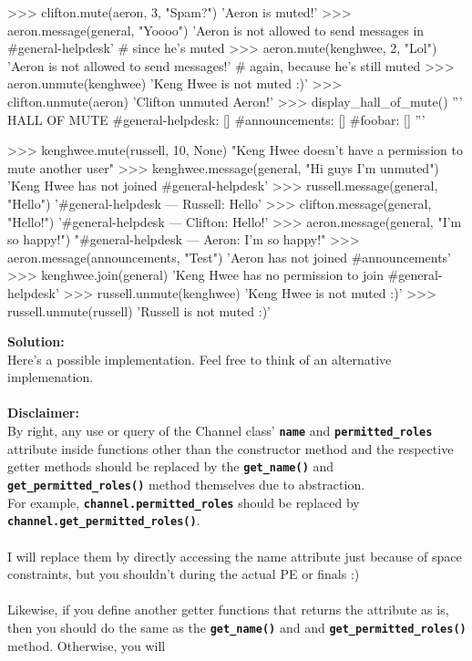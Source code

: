\begin{python}
>>> clifton.mute(aeron, 3, "Spam?")
'Aeron is muted!'
>>> aeron.message(general, "Yoooo")
'Aeron is not allowed to send messages in #general-helpdesk'
# since he's muted
>>> aeron.mute(kenghwee, 2, "Lol")
'Aeron is not allowed to send messages!'
# again, because he's still muted
>>> aeron.unmute(kenghwee)
'Keng Hwee is not muted :)'
>>> clifton.unmute(aeron)
'Clifton unmuted Aeron!'
>>> display_hall_of_mute()
'''
HALL OF MUTE
#general-helpdesk: []
#announcements: []
#foobar: []
'''

>>> kenghwee.mute(russell, 10, None)
"Keng Hwee doesn't have a permission to mute another user"
>>> kenghwee.message(general, "Hi guys I'm unmuted")
'Keng Hwee has not joined #general-helpdesk'
>>> russell.message(general, "Hello")
'#general-helpdesk --- Russell: Hello'
>>> clifton.message(general, "Hello!")
'#general-helpdesk --- Clifton: Hello!'
>>> aeron.message(general, "I'm so happy!")
"#general-helpdesk --- Aeron: I'm so happy!"
>>> aeron.message(announcements, "Test")
'Aeron has not joined #announcements'
>>> kenghwee.join(general)
'Keng Hwee has no permission to join #general-helpdesk'
>>> russell.unmute(kenghwee)
'Keng Hwee is not muted :)'
>>> russell.unmute(russell)
'Russell is not muted :)'
\end{python}
\textbf{Solution:} \\
Here's a possible implementation. Feel free to think of an alternative implemenation. \\ \\
\textbf{Disclaimer:} \\
By right, any use or query of the Channel class' \texttt{\bfseries name} and \texttt{\bfseries permitted\_roles} attribute 
inside functions other than the constructor method and the respective getter methods should be replaced by 
the \texttt{\bfseries get\_name()} and \texttt{\bfseries get\_permitted\_roles()} method themselves due to abstraction. \\
For example, \texttt{\bfseries channel.permitted\_roles} should be replaced by \texttt{\bfseries channel.get\_permitted\_roles()}. \\ \\
I will replace them by directly accessing the name attribute just because of space constraints, 
but you shouldn't during the actual PE or finals :) \\ \\
Likewise, if you define another getter functions that returns the attribute as is, then you should do the same as 
the \texttt{\bfseries get\_name()} and and \texttt{\bfseries get\_permitted\_roles()} method. Otherwise, you will 

